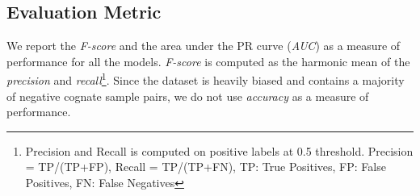 \documentclass[11pt,letterpaper]{article}
\begin{document}
\subsection{Evaluation Metric}

We report the \textit{F-score} and the area under the PR curve (\textit{AUC}) as a measure of performance for all the models. \textit{F-score} is computed as the harmonic mean of the \textit{precision} and \textit{recall}\footnote{Precision and Recall is computed on positive labels at 0.5 threshold. Precision = TP/(TP+FP), Recall = TP/(TP+FN), TP: True Positives, FP: False Positives, FN: False Negatives}. Since the dataset is heavily biased and contains a majority of negative cognate sample pairs, we do not use \textit{accuracy} as a measure of performance.

\end{document}

